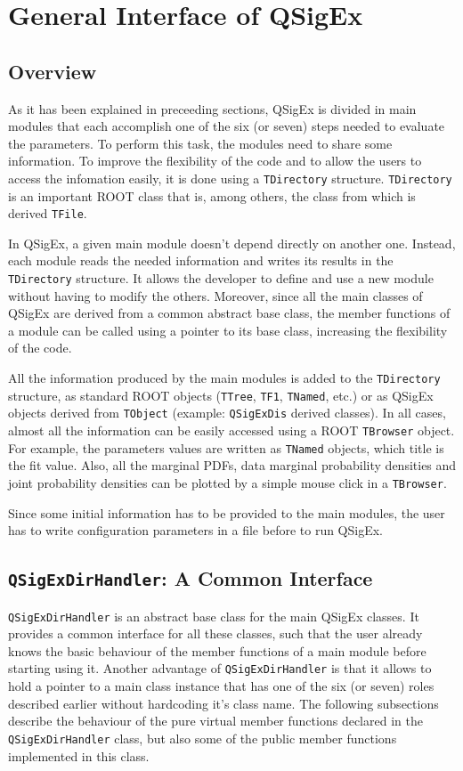\chapter{General Interface of QSigEx}
\section{Overview}
As it has been explained in preceeding sections, QSigEx is divided in main modules that each accomplish one of the six (or seven) steps needed to evaluate the parameters.
To perform this task, the modules need to share some information.
To improve the flexibility of the code and to allow the users to access the infomation easily, it is done using a \texttt{TDirectory} structure.
\texttt{TDirectory} is an important ROOT class that is, among others, the class from which is derived \texttt{TFile}.

In QSigEx, a given main module doesn't depend directly on another one.
Instead, each module reads the needed information  and writes its results in the \texttt{TDirectory} structure.
It allows the developer to define and use a new module without having to modify the others.
Moreover, since all the main classes of QSigEx are derived from a common abstract base class, the member functions of a module can be called using a pointer to its base class, increasing the flexibility of the code.

All the information produced by the main modules is added to the \texttt{TDirectory} structure, as standard ROOT objects (\texttt{TTree}, \texttt{TF1}, \texttt{TNamed}, etc.) or as QSigEx objects derived from \texttt{TObject} (example: \texttt{QSigExDis} derived classes).
In all cases, almost all the information can be easily accessed using a ROOT \texttt{TBrowser} object.
For example, the parameters values are written as \texttt{TNamed} objects, which title is the fit value.
Also, all the marginal PDFs, data marginal probability densities and joint probability densities can be plotted by a simple mouse click in a \texttt{TBrowser}.

Since some initial information has to be provided to the main modules, the user has to write configuration parameters in a file before to run QSigEx.

\section{\texttt{QSigExDirHandler}: A Common Interface}
\texttt{QSigExDirHandler} is an abstract base class for the main QSigEx classes.
It provides a common interface for all these classes, such that the user already knows the basic behaviour of the member functions of a main module before starting using it.
Another advantage of \texttt{QSigExDirHandler} is that it allows to hold a pointer to a main class instance that has one of the six (or seven) roles described earlier without hardcoding it's class name.
The following subsections describe the behaviour of the pure virtual member functions declared in the \texttt{QSigExDirHandler} class, but also some of the public member functions implemented in this class. 


